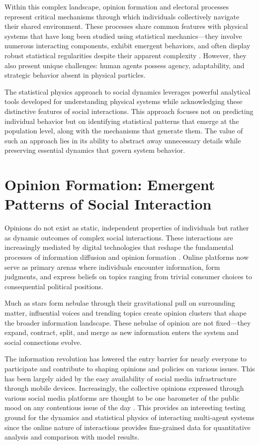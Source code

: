 Within this complex landscape, opinion formation and electoral processes represent critical mechanisms through which individuals collectively navigate their shared environment. These processes share common features with physical systems that have long been studied using statistical mechanics—they involve numerous interacting components, exhibit emergent behaviors, and often display robust statistical regularities despite their apparent complexity \cite{galam1982sociophysics, galam1991towards}. However, they also present unique challenges: human agents possess agency, adaptability, and strategic behavior absent in physical particles.

The statistical physics approach to social dynamics leverages powerful analytical tools developed for understanding physical systems while acknowledging these distinctive features of social interactions. This approach focuses not on predicting individual behavior but on identifying statistical patterns that emerge at the population level, along with the mechanisms that generate them. The value of such an approach lies in its ability to abstract away unnecessary details while preserving essential dynamics that govern system behavior.

\section{Opinion Formation: Emergent Patterns of Social Interaction}
Opinions do not exist as static, independent properties of individuals but rather as dynamic outcomes of complex social interactions. These interactions are increasingly mediated by digital technologies that reshape the fundamental processes of information diffusion and opinion formation \cite{social-media-as-public-opinion}. Online platforms now serve as primary arenas where individuals encounter information, form judgments, and express beliefs on topics ranging from trivial consumer choices to consequential political positions.

Much as stars form nebulae through their gravitational pull on surrounding matter, influential voices and trending topics create opinion clusters that shape the broader information landscape. These nebulae of opinion are not fixed—they expand, contract, split, and merge as new information enters the system and social connections evolve.

The information revolution has lowered the entry barrier for nearly everyone to participate and contribute to shaping opinions and policies on various issues. This has been largely aided by the easy availability of social media infrastructure through mobile devices. Increasingly, the collective opinions expressed through various social media platforms are thought to be one barometer of the public mood on any contentious issue of the day \cite{social-media-as-public-opinion}. This provides an interesting testing ground for the dynamics and statistical physics of interacting multi-agent systems since the online nature of interactions provides fine-grained data for quantitative analysis and comparison with model results.

